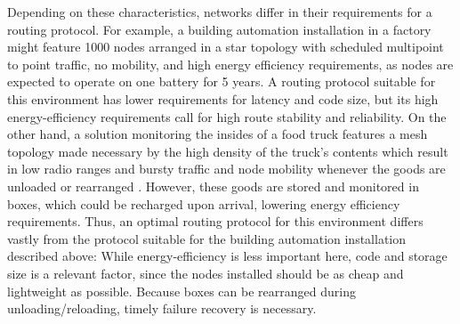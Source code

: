 \documentclass{acm_proc_article-sp}
\begin{document}
Depending on these characteristics, networks differ in their requirements for a routing protocol. For example, a building automation installation in a factory might feature 1000 nodes arranged in a star topology with scheduled multipoint to point traffic, no mobility, and high energy efficiency requirements, as nodes are expected to operate on one battery for 5 years\cite{RFC-5867}. A routing protocol suitable for this environment has lower requirements for latency and code size, but its high energy-efficiency requirements call for high route stability and reliability.
On the other hand, a solution monitoring the insides of a food truck features a mesh topology made necessary by the high density of the truck's contents which result in low radio ranges and bursty traffic and node mobility whenever the goods are unloaded or rearranged \cite{food_monitoring}. However, these goods are stored and monitored in boxes, which could be recharged upon arrival, lowering energy efficiency requirements. Thus, an optimal routing protocol for this environment differs vastly from the protocol suitable for the building automation installation described above: While energy-efficiency is less important here, code and storage size is a relevant factor, since the nodes installed should be as cheap and lightweight as possible. Because boxes can be rearranged during unloading/reloading, timely failure recovery is necessary.
\end{document}
